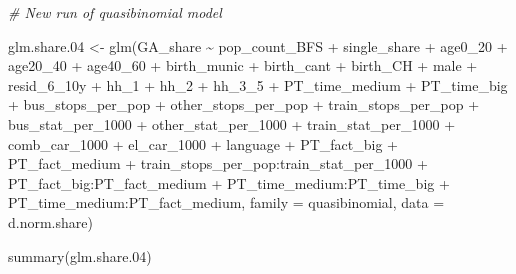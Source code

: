 \documentclass[
]{article}
\newenvironment{Shaded}{\begin{snugshade}}{\end{snugshade}}
\newcommand{\AttributeTok}[1]{\textcolor[rgb]{0.77,0.63,0.00}{#1}}
\newcommand{\CommentTok}[1]{\textcolor[rgb]{0.56,0.35,0.01}{\textit{#1}}}
\newcommand{\FloatTok}[1]{\textcolor[rgb]{0.00,0.00,0.81}{#1}}
\newcommand{\FunctionTok}[1]{\textcolor[rgb]{0.00,0.00,0.00}{#1}}
\newcommand{\NormalTok}[1]{#1}
\newcommand{\OtherTok}[1]{\textcolor[rgb]{0.56,0.35,0.01}{#1}}
\newcommand{\SpecialCharTok}[1]{\textcolor[rgb]{0.00,0.00,0.00}{#1}}
\begin{document}
\begin{Shaded}
\begin{Highlighting}[]
\CommentTok{\# New run of quasibinomial model}

\NormalTok{glm.share}\FloatTok{.04} \OtherTok{\textless{}{-}} \FunctionTok{glm}\NormalTok{(GA\_share }\SpecialCharTok{\textasciitilde{}}\NormalTok{ pop\_count\_BFS }\SpecialCharTok{+}\NormalTok{ single\_share }\SpecialCharTok{+}\NormalTok{ age0\_20 }\SpecialCharTok{+}\NormalTok{ age20\_40 }\SpecialCharTok{+} 
\NormalTok{      age40\_60 }\SpecialCharTok{+}\NormalTok{ birth\_munic }\SpecialCharTok{+}\NormalTok{ birth\_cant }\SpecialCharTok{+}\NormalTok{ birth\_CH }\SpecialCharTok{+}\NormalTok{ male }\SpecialCharTok{+}\NormalTok{ resid\_6\_10y }\SpecialCharTok{+}\NormalTok{ hh\_1 }\SpecialCharTok{+}\NormalTok{ hh\_2 }\SpecialCharTok{+} 
\NormalTok{      hh\_3\_5 }\SpecialCharTok{+}\NormalTok{ PT\_time\_medium }\SpecialCharTok{+}\NormalTok{ PT\_time\_big }\SpecialCharTok{+}\NormalTok{ bus\_stops\_per\_pop }\SpecialCharTok{+}\NormalTok{ other\_stops\_per\_pop }\SpecialCharTok{+} 
\NormalTok{      train\_stops\_per\_pop }\SpecialCharTok{+}\NormalTok{ bus\_stat\_per\_1000 }\SpecialCharTok{+}\NormalTok{ other\_stat\_per\_1000 }\SpecialCharTok{+}\NormalTok{ train\_stat\_per\_1000 }\SpecialCharTok{+} 
\NormalTok{      comb\_car\_1000 }\SpecialCharTok{+}\NormalTok{ el\_car\_1000 }\SpecialCharTok{+}\NormalTok{ language }\SpecialCharTok{+}\NormalTok{ PT\_fact\_big }\SpecialCharTok{+}\NormalTok{ PT\_fact\_medium }\SpecialCharTok{+} 
\NormalTok{      train\_stops\_per\_pop}\SpecialCharTok{:}\NormalTok{train\_stat\_per\_1000 }\SpecialCharTok{+}\NormalTok{  PT\_fact\_big}\SpecialCharTok{:}\NormalTok{PT\_fact\_medium }\SpecialCharTok{+} 
\NormalTok{      PT\_time\_medium}\SpecialCharTok{:}\NormalTok{PT\_time\_big }\SpecialCharTok{+}\NormalTok{ PT\_time\_medium}\SpecialCharTok{:}\NormalTok{PT\_fact\_medium, }
                    \AttributeTok{family =}\NormalTok{ quasibinomial, }\AttributeTok{data =}\NormalTok{ d.norm.share)}

\FunctionTok{summary}\NormalTok{(glm.share}\FloatTok{.04}\NormalTok{)}
\end{Highlighting}
\end{Shaded}
\end{document}
